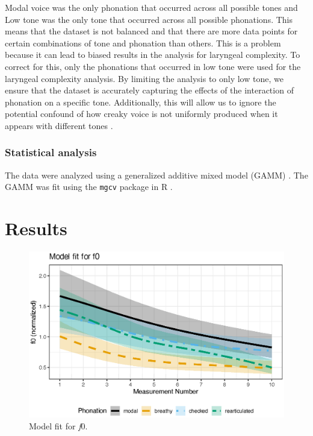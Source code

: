 Modal voice was the only phonation that occurred across all possible tones and Low tone was the only tone that occurred across all possible phonations. This means that the dataset is not balanced and that there are more data points for certain combinations of tone and phonation than others. This is a problem because it can lead to biased results in the analysis for laryngeal complexity. To correct for this, only the phonations that occurred in low tone were used for the laryngeal complexity analysis. By limiting the analysis to only low tone, we ensure that the dataset is accurately capturing the effects of the interaction of phonation on a specific tone. Additionally, this will allow us to ignore the potential confound of how creaky voice is not uniformly produced when it appears with different tones \citep{keatingAcousticPropertiesDifferent2015}.

\subsubsection{Statistical analysis} \label{sec:statistical_analysis}

The data were analyzed using a generalized additive mixed model (GAMM) \citep{hastieGeneralizedAdditiveModels1986,woodGeneralizedAdditiveModels2017,soskuthyGeneralisedAdditiveMixed2017,wielingAnalyzingDynamicPhonetic2018}. The GAMM was fit using the \texttt{mgcv} package in R \citep{woodGeneralizedAdditiveModels2017}.


\section{Results}\label{sec:results_of_lc}

\begin{figure}[h!]
    \centering
    \includegraphics[]{images/LCH_GAMMs/f0_model_fit.eps}
    \caption{Model fit for \textit{f}0.}
    \label{fig:f0_model_fit}
\end{figure}

